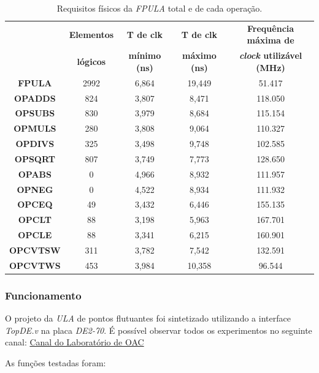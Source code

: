 \documentclass[12pt]{article}
\begin{document}
\begin{table}[H]
	\centering
	\begin{tabular}{|c|c|c|c|c|}
		\hline
		& \textbf{Elementos} & \textbf{T de clk} & \textbf{T de clk} &  					\textbf{Frequência máxima de} \\
		& \textbf{lógicos} & \textbf{mínimo (ns)} & \textbf{máximo (ns)} & \textbf{\textit{clock} utilizável (MHz)} \\
		\hline
		\textbf{FPULA} & 2992 & 6,864 & 19,449 & 51.417 \\\hline
		\textbf{OPADDS} & 824 & 3,807 & 8,471 & 118.050 \\\hline
		\textbf{OPSUBS} & 830 & 3,979 & 8,684 & 115.154 \\\hline
		\textbf{OPMULS} & 280 & 3,808 & 9,064 & 110.327 \\\hline
		\textbf{OPDIVS} & 325 & 3,498 & 9,748 & 102.585 \\\hline
		\textbf{OPSQRT} & 807 & 3,749 & 7,773 & 128.650 \\\hline
		\textbf{OPABS} & 0 & 4,966 & 8,932 & 111.957 \\\hline
		\textbf{OPNEG} & 0 & 4,522 & 8,934 & 111.932 \\\hline
		\textbf{OPCEQ} & 49 & 3,432 & 6,446 & 155.135 \\\hline
		\textbf{OPCLT} & 88 & 3,198 & 5,963 & 167.701 \\\hline
		\textbf{OPCLE} & 88 & 3,341 & 6,215 & 160.901 \\\hline
		\textbf{OPCVTSW} & 311 & 3,782 & 7,542 & 132.591 \\\hline
		\textbf{OPCVTWS} & 453 & 3,984 & 10,358 & 96.544 \\\hline
	\end{tabular}
	\caption{Requisitos físicos da \textit{FPULA} total e de cada operação.}
	\label{tab:req3}
\end{table}

\subsubsection{Funcionamento}
\label{subsubsec:fpulafunc}

O projeto da \textit{ULA} de pontos flutuantes foi sintetizado utilizando a interface \textit{TopDE.v} na placa \textit{DE2-70}. É possível observar todos os experimentos no seguinte canal: \href{https://www.youtube.com/channel/UCtyrFYKa4yLMnlFPTT5Mthw/videos?view_as=subscriber}{Canal do Laboratório de OAC} 

As funções testadas foram:
\end{document}
